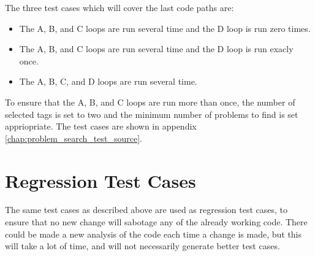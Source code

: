 The three test cases which will cover the last code paths are:
\begin{itemize}
	\item The A, B, and C loops are run several time and the D loop is run zero times.
	\item The A, B, and C loops are run several time and the D loop is run exacly once.
	\item The A, B, C, and D loops are run several time.
\end{itemize}
To ensure that the A, B, and C loops are run more than once, the number of selected tags is set to two and the minimum number of problems to find is set appriopriate.
The test cases are shown in appendix \ref{chap:problem_search_test_source}.

\section{Regression Test Cases}
\label{sec:regression_problem_search}
The same test cases as described above are used as regression test cases, to ensure that no new change will sabotage any of the already working code.
There could be made a new analysis of the code each time a change is made, but this will take a lot of time, and will not necessarily generate better test cases.
